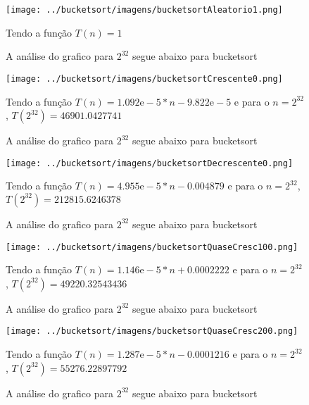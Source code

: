 \documentclass[12pt,a4paper,twoside]{report}
\begin{document}
\begin{figure}[ht]
\centering \texttt{[image: ../bucketsort/imagens/bucketsortAleatorio1.png]}
\caption{A análise do grafico para $2^{32}$ segue abaixo para bucketsort}

Tendo a função $T(n) = 1 $ 
\label{fig:bucketsortAleatorio1}
\end{figure}




\begin{figure}[ht]
\centering \texttt{[image: ../bucketsort/imagens/bucketsortCrescente0.png]}
\caption{ A análise do grafico para $2^{32}$ segue abaixo para bucketsort}

Tendo a função $T(n) = 1.092\mathrm{e}-5*n-9.822\mathrm{e}-5$ e para o $n =2^{32}$, $T(2^{32}) = 46901.0427741$ 
\label{fig:bucketsortCrescente0}
\end{figure}



\begin{figure}[ht]
\centering \texttt{[image: ../bucketsort/imagens/bucketsortDecrescente0.png]}
\caption{A análise do grafico para $2^{32}$ segue abaixo para bucketsort}

Tendo a função $T(n) = 4.955\mathrm{e}-5*n-0.004879$ e para o $n =2^{32}$, $T(2^{32}) = 212815.6246378$ 
\label{fig:bucketsortDecrescente0}
\end{figure}



\begin{figure}[ht]
\centering \texttt{[image: ../bucketsort/imagens/bucketsortQuaseCresc100.png]}
\caption{A análise do grafico para $2^{32}$ segue abaixo para bucketsort}

Tendo a função $T(n) = 1.146\mathrm{e}-5*n+0.0002222$ e para o $n =2^{32}$, $T(2^{32}) = 49220.32543436$ 
\label{fig:bucketsortQuaseCresc100}
\end{figure}




\begin{figure}[ht]
\centering \texttt{[image: ../bucketsort/imagens/bucketsortQuaseCresc200.png]}
\caption{A análise do grafico para $2^{32}$ segue abaixo para bucketsort}

Tendo a função $T(n) = 1.287\mathrm{e}-5*n-0.0001216$ e para o $n =2^{32}$, $T(2^{32}) = 55276.22897792$ 
\label{fig:bucketsortQuaseCresc200}
\end{figure}
\end{document}
